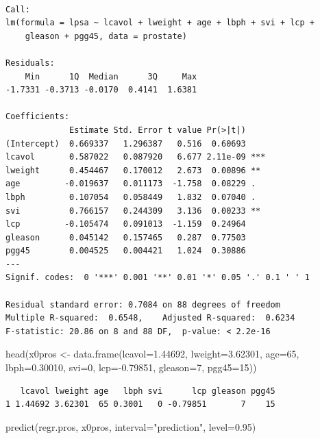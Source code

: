 \documentclass[
  letterpaper,
  DIV=11,
  numbers=noendperiod]{scrartcl}
\newenvironment{Shaded}{\begin{snugshade}}{\end{snugshade}}
\newcommand{\AttributeTok}[1]{\textcolor[rgb]{0.40,0.45,0.13}{#1}}
\newcommand{\DecValTok}[1]{\textcolor[rgb]{0.68,0.00,0.00}{#1}}
\newcommand{\FloatTok}[1]{\textcolor[rgb]{0.68,0.00,0.00}{#1}}
\newcommand{\FunctionTok}[1]{\textcolor[rgb]{0.28,0.35,0.67}{#1}}
\newcommand{\NormalTok}[1]{\textcolor[rgb]{0.00,0.23,0.31}{#1}}
\newcommand{\OtherTok}[1]{\textcolor[rgb]{0.00,0.23,0.31}{#1}}
\newcommand{\SpecialCharTok}[1]{\textcolor[rgb]{0.37,0.37,0.37}{#1}}
\newcommand{\StringTok}[1]{\textcolor[rgb]{0.13,0.47,0.30}{#1}}
\begin{document}
\begin{verbatim}

Call:
lm(formula = lpsa ~ lcavol + lweight + age + lbph + svi + lcp + 
    gleason + pgg45, data = prostate)

Residuals:
    Min      1Q  Median      3Q     Max 
-1.7331 -0.3713 -0.0170  0.4141  1.6381 

Coefficients:
             Estimate Std. Error t value Pr(>|t|)    
(Intercept)  0.669337   1.296387   0.516  0.60693    
lcavol       0.587022   0.087920   6.677 2.11e-09 ***
lweight      0.454467   0.170012   2.673  0.00896 ** 
age         -0.019637   0.011173  -1.758  0.08229 .  
lbph         0.107054   0.058449   1.832  0.07040 .  
svi          0.766157   0.244309   3.136  0.00233 ** 
lcp         -0.105474   0.091013  -1.159  0.24964    
gleason      0.045142   0.157465   0.287  0.77503    
pgg45        0.004525   0.004421   1.024  0.30886    
---
Signif. codes:  0 '***' 0.001 '**' 0.01 '*' 0.05 '.' 0.1 ' ' 1

Residual standard error: 0.7084 on 88 degrees of freedom
Multiple R-squared:  0.6548,    Adjusted R-squared:  0.6234 
F-statistic: 20.86 on 8 and 88 DF,  p-value: < 2.2e-16
\end{verbatim}

\begin{Shaded}
\begin{Highlighting}[]
\FunctionTok{head}\NormalTok{(x0pros }\OtherTok{\textless{}{-}} \FunctionTok{data.frame}\NormalTok{(}\AttributeTok{lcavol=}\FloatTok{1.44692}\NormalTok{,}
                      \AttributeTok{lweight=}\FloatTok{3.62301}\NormalTok{,}
                      \AttributeTok{age=}\DecValTok{65}\NormalTok{,}
                      \AttributeTok{lbph=}\FloatTok{0.30010}\NormalTok{,}
                      \AttributeTok{svi=}\DecValTok{0}\NormalTok{,}
                      \AttributeTok{lcp=}\SpecialCharTok{{-}}\FloatTok{0.79851}\NormalTok{,}
                      \AttributeTok{gleason=}\DecValTok{7}\NormalTok{,}
                      \AttributeTok{pgg45=}\DecValTok{15}\NormalTok{))}
\end{Highlighting}
\end{Shaded}

\begin{verbatim}
   lcavol lweight age   lbph svi      lcp gleason pgg45
1 1.44692 3.62301  65 0.3001   0 -0.79851       7    15
\end{verbatim}

\begin{Shaded}
\begin{Highlighting}[]
 \FunctionTok{predict}\NormalTok{(regr.pros, x0pros, }\AttributeTok{interval=}\StringTok{"prediction"}\NormalTok{, }\AttributeTok{level=}\FloatTok{0.95}\NormalTok{) }
\end{Highlighting}
\end{Shaded}
\end{document}
